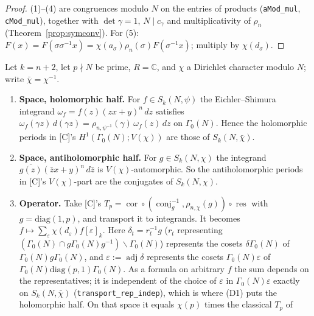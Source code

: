 \begin{proof}
  \leanok
  (1)--(4) are congruences modulo $N$ on the entries of products (\texttt{aMod\_mul}, \texttt{cMod\_mul}), together with
  $\det\gamma=1$, $N\mid c_\gamma$ and multiplicativity of $\rho_n$ (Theorem~\ref{prop:symconv}). For (5):
  $F(x)=F(\sigma\sigma^{-1}x)=\chi(a_\sigma)\rho_n(\sigma)F(\sigma^{-1}x)$; multiply by $\chi(d_\sigma)$.
\end{proof}

\begin{theorem}\label{bridge:nebentypus-dictionary}
  \leanok
  Let $k=n+2$, let $p\nmid N$ be prime, $R=\mathbb C$, and $\chi$ a Dirichlet character modulo $N$; write
  $\bar\chi=\chi^{-1}$.
  \begin{enumerate}
    \item[(D1)] \textbf{Space, holomorphic half.} For $f\in S_k(N,\psi)$ the Eichler--Shimura integrand
      $\omega_f=f(z)(zx+y)^n\,dz$ satisfies $\omega_f(\gamma z)\,d(\gamma z)=\rho_{n,\psi^{-1}}(\gamma)\,\omega_f(z)\,dz$
      on $\Gamma_0(N)$. Hence the holomorphic periods in [C]'s $H^1(\Gamma_0(N);V(\chi))$ are those of
      $S_k(N,\bar\chi)$.
    \item[(D1')] \textbf{Space, antiholomorphic half.} For $g\in S_k(N,\chi)$ the integrand
      $\overline{g(z)}(\bar zx+y)^n\,d\bar z$ is $V(\chi)$-automorphic. So the antiholomorphic periods in [C]'s
      $V(\chi)$-part are the conjugates of $S_k(N,\chi)$.
    \item[(D2)] \textbf{Operator.} Take [C]'s
      $T_p=\operatorname{cor}\circ(\operatorname{conj}_g^{-1},\rho_{n,\chi}(g))\circ\operatorname{res}$ with
      $g=\mathrm{diag}(1,p)$, and transport it to integrands. It becomes
      $f\mapsto\sum_{\varepsilon}\chi(d_\varepsilon)f[\varepsilon]_k$. Here $\delta_t=r_t^{-1}g$ ($r_t$ representing
      $(\Gamma_0(N)\cap g\Gamma_0(N)g^{-1})\backslash\Gamma_0(N)$) represents the cosets $\delta\Gamma_0(N)$ of
      $\Gamma_0(N)g\Gamma_0(N)$, and $\varepsilon:=\operatorname{adj}\delta$ represents the cosets $\Gamma_0(N)\varepsilon$ of
      $\Gamma_0(N)\mathrm{diag}(p,1)\Gamma_0(N)$. As a formula on arbitrary $f$ the sum depends on the representatives;
      it is independent of the choice of $\varepsilon$ in $\Gamma_0(N)\varepsilon$ exactly on $S_k(N,\bar\chi)$
      (\texttt{transport\_rep\_indep}), which is where (D1) puts the holomorphic half. On that space it equals $\chi(p)$ times the classical $T_p$ of

\end{enumerate}
\end{theorem}
